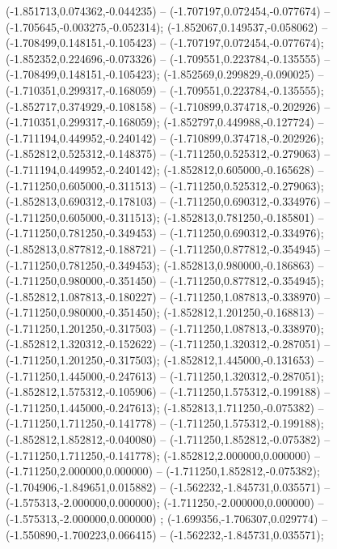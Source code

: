  (-1.851713,0.074362,-0.044235) -- (-1.707197,0.072454,-0.077674) -- (-1.705645,-0.003275,-0.052314);
 (-1.852067,0.149537,-0.058062) -- (-1.708499,0.148151,-0.105423) -- (-1.707197,0.072454,-0.077674);
 (-1.852352,0.224696,-0.073326) -- (-1.709551,0.223784,-0.135555) -- (-1.708499,0.148151,-0.105423);
 (-1.852569,0.299829,-0.090025) -- (-1.710351,0.299317,-0.168059) -- (-1.709551,0.223784,-0.135555);
 (-1.852717,0.374929,-0.108158) -- (-1.710899,0.374718,-0.202926) -- (-1.710351,0.299317,-0.168059);
 (-1.852797,0.449988,-0.127724) -- (-1.711194,0.449952,-0.240142) -- (-1.710899,0.374718,-0.202926);
 (-1.852812,0.525312,-0.148375) -- (-1.711250,0.525312,-0.279063) -- (-1.711194,0.449952,-0.240142);
 (-1.852812,0.605000,-0.165628) -- (-1.711250,0.605000,-0.311513) -- (-1.711250,0.525312,-0.279063);
 (-1.852813,0.690312,-0.178103) -- (-1.711250,0.690312,-0.334976) -- (-1.711250,0.605000,-0.311513);
 (-1.852813,0.781250,-0.185801) -- (-1.711250,0.781250,-0.349453) -- (-1.711250,0.690312,-0.334976);
 (-1.852813,0.877812,-0.188721) -- (-1.711250,0.877812,-0.354945) -- (-1.711250,0.781250,-0.349453);
 (-1.852813,0.980000,-0.186863) -- (-1.711250,0.980000,-0.351450) -- (-1.711250,0.877812,-0.354945);
 (-1.852812,1.087813,-0.180227) -- (-1.711250,1.087813,-0.338970) -- (-1.711250,0.980000,-0.351450);
 (-1.852812,1.201250,-0.168813) -- (-1.711250,1.201250,-0.317503) -- (-1.711250,1.087813,-0.338970);
 (-1.852812,1.320312,-0.152622) -- (-1.711250,1.320312,-0.287051) -- (-1.711250,1.201250,-0.317503);
 (-1.852812,1.445000,-0.131653) -- (-1.711250,1.445000,-0.247613) -- (-1.711250,1.320312,-0.287051);
 (-1.852812,1.575312,-0.105906) -- (-1.711250,1.575312,-0.199188) -- (-1.711250,1.445000,-0.247613);
 (-1.852813,1.711250,-0.075382) -- (-1.711250,1.711250,-0.141778) -- (-1.711250,1.575312,-0.199188);
 (-1.852812,1.852812,-0.040080) -- (-1.711250,1.852812,-0.075382) -- (-1.711250,1.711250,-0.141778);
 (-1.852812,2.000000,0.000000) -- (-1.711250,2.000000,0.000000) -- (-1.711250,1.852812,-0.075382);
 (-1.704906,-1.849651,0.015882) -- (-1.562232,-1.845731,0.035571) -- (-1.575313,-2.000000,0.000000);
 (-1.711250,-2.000000,0.000000) -- (-1.575313,-2.000000,0.000000) ;
 (-1.699356,-1.706307,0.029774) -- (-1.550890,-1.700223,0.066415) -- (-1.562232,-1.845731,0.035571);
